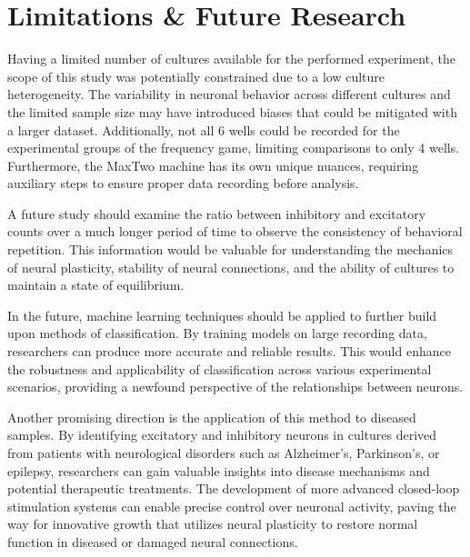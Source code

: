 \documentclass{article} %
\begin{document}
\section{Limitations \& Future Research}
Having a limited number of cultures available for the performed experiment, the scope of this study was potentially constrained due to a low culture heterogeneity. The variability in neuronal behavior across different cultures and the limited sample size may have introduced biases that could be mitigated with a larger dataset. Additionally, not all 6 wells could be recorded for the experimental groups of the frequency game, limiting comparisons to only 4 wells. Furthermore, the MaxTwo machine has its own unique nuances, requiring auxiliary steps to ensure proper data recording before analysis.

A future study should examine the ratio between inhibitory and excitatory counts over a much longer period of time to observe the consistency of behavioral repetition. This information would be valuable for understanding the mechanics of neural plasticity, stability of neural connections, and the ability of cultures to maintain a state of equilibrium.

In the future, machine learning techniques should be applied to further build upon methods of classification. By training models on large recording data, researchers can produce more accurate and reliable results. This would enhance the robustness and applicability of classification across various experimental scenarios, providing a newfound perspective of the relationships between neurons.

Another promising direction is the application of this method to diseased samples. By identifying excitatory and inhibitory neurons in cultures derived from patients with neurological disorders such as Alzheimer's, Parkinson's, or epilepsy, researchers can gain valuable insights into disease mechanisms and potential therapeutic treatments. The development of more advanced closed-loop stimulation systems can enable precise control over neuronal activity, paving the way for innovative growth that utilizes neural plasticity to restore normal function in diseased or damaged neural connections.



\end{document}
